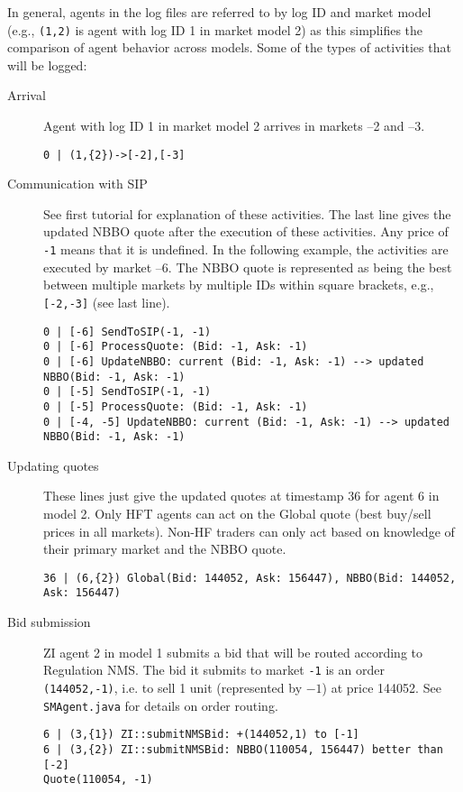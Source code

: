 \documentclass[11pt]{article}
\begin{document}
In general, agents in the log files are referred to by log ID and market model (e.g., \texttt{(1,{2})} is agent with log ID 1 in market model 2) as this simplifies the comparison of agent behavior across models.
Some of the types of activities that will be logged:
%
\begin{description}

\item[Arrival] Agent with log ID 1 in market model 2 arrives in markets --2 and --3.
\begin{verbatim}
0 | (1,{2})->[-2],[-3]
\end{verbatim}
\item[Communication with SIP] See first tutorial for explanation of these activities. The last line gives the updated NBBO quote after the execution of these activities. Any price of \texttt{-1} means that it is undefined. In the following example, the activities are executed by market --6.
The NBBO quote is represented as being the best between multiple markets by multiple IDs within square brackets, e.g., \texttt{[-2,-3]} (see last line).
\begin{verbatim}
0 | [-6] SendToSIP(-1, -1)
0 | [-6] ProcessQuote: (Bid: -1, Ask: -1)
0 | [-6] UpdateNBBO: current (Bid: -1, Ask: -1) --> updated NBBO(Bid: -1, Ask: -1)
0 | [-5] SendToSIP(-1, -1)
0 | [-5] ProcessQuote: (Bid: -1, Ask: -1)
0 | [-4, -5] UpdateNBBO: current (Bid: -1, Ask: -1) --> updated NBBO(Bid: -1, Ask: -1)
\end{verbatim}

\item[Updating quotes] These lines just give the updated quotes at timestamp 36 for agent 6 in model 2. Only HFT agents can act on the Global quote (best buy/sell prices in all markets).
Non-HF traders can only act based on knowledge of their primary market and the NBBO quote.
\begin{verbatim}
36 | (6,{2}) Global(Bid: 144052, Ask: 156447), NBBO(Bid: 144052, Ask: 156447)
\end{verbatim}

\item[Bid submission] ZI agent 2 in model 1 submits a bid that will be routed according to Regulation NMS. The bid it submits to market \texttt{-1} is an order \texttt{(144052,-1)}, i.e. to sell 1 unit (represented by $-1$) at price 144052.
See \texttt{SMAgent.java} for details on order routing.
\begin{verbatim}
6 | (3,{1}) ZI::submitNMSBid: +(144052,1) to [-1]
6 | (3,{2}) ZI::submitNMSBid: NBBO(110054, 156447) better than [-2] 
Quote(110054, -1)
\end{verbatim}


\end{description}
\end{document}
